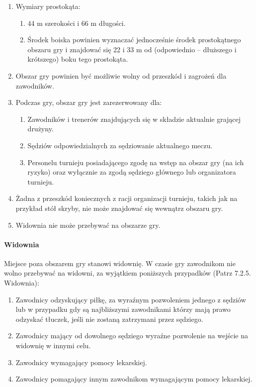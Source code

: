 \documentclass[12pt]{article}
\begin{document}
\begin{enumerate}
\item Wymiary prostokąta:
  \begin{enumerate}
  \item 44 m szerokości i 66 m długości.
  \item Środek boiska powinien wyznaczać jednocześnie środek prostokątnego
    obszaru gry i znajdować się 22 i 33 m od (odpowiednio -- dłuższego i
    krótszego) boku tego prostokąta.
  \end{enumerate}

\item Obszar gry powinien być możliwie wolny od przeszkód i zagrożeń dla
  zawodników.

\item Podczas gry, obszar gry jest zarezerwowany dla:
  \begin{enumerate}
  \item Zawodników i trenerów znajdujących się w składzie aktualnie grającej
    drużyny.
  \item Sędziów odpowiedzialnych za sędziowanie aktualnego meczu.
  \item Personelu turnieju posiadającego zgodę na wstęp na obszar gry (na
    ich ryzyko) oraz wyłącznie za zgodą sędziego głównego lub
    organizatora turnieju.
  \end{enumerate}

\item Żadna z przeszkód koniecznych z racji organizacji turnieju, takich jak
  na przykład stół skryby, nie może znajdować się wewnątrz obszaru gry.

\item Widownia nie może przebywać na obszarze gry.
\end{enumerate}

\paragraph{Widownia}
Miejsce poza obszarem gry stanowi widownię.
W czasie gry zawodnikom nie wolno przebywać na widowni, za wyjątkiem
poniższych przypadków (Patrz 7.2.5. Widownia):

\begin{enumerate}
\item Zawodnicy odzyskujący piłkę, za wyraźnym pozwoleniem jednego z sędziów
  lub w przypadku gdy są najbliższymi zawodnikami którzy mają prawo
  odzyskać tłuczek, jeśli nie zostaną zatrzymani przez sędziego.

\item Zawodnicy mający od dowolnego sędziego wyraźne pozwolenie na wejście
  na widownię w innymi celu.

\item Zawodnicy wymagający pomocy lekarskiej.

\item Zawodnicy pomagający innym zawodnikom wymagającym pomocy lekarskiej.
\end{enumerate}
\end{document}
